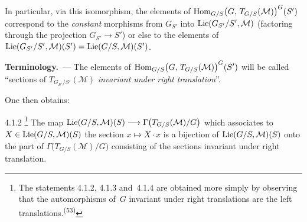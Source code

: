 In particular, via this isomorphism, the elements of
\(\operatorname{Hom}_{G/S}\bigl(G,\,T_{G/S}(\mathcal{M})\bigr)^{G}(S')\)
correspond to the \emph{constant} morphisms from \(G_{S'}\) into
\(\operatorname{Lie}(G_{S'}/S',\mathcal{M})\) (\ie factoring through the projection
\(G_{S'}\to S'\)) or else to the elements of
\(\operatorname{Lie}(G_{S'}/S',\mathcal{M})(S')=\operatorname{Lie}(G/S,\mathcal{M})(S')\).

\par{}
\noindent\textbf{Terminology.}\ ---
The elements of
\(\operatorname{Hom}_{G/S}\bigl(G,\,T_{G/S}(\mathcal{M})\bigr)^{G}(S')\)
will be called ``sections of \(T_{G_{S'}/S'}(\mathcal{M})\)
\emph{invariant under right translation}''.

One then obtains:

\begin{proposition}{4.1.2}\label{II.4.1.2}
{\renewcommand{\thefootnote}{*}\footnote{The statements 4.1.2, 4.1.3
and~4.1.4 are obtained more simply by observing that the automorphisms
of~\(G\) invariant under right translations are the left
translations.\textsuperscript{(53)}}}%
The map
\(\operatorname{Lie}(G/S,\mathcal{M})(S)\longrightarrow\Gamma\bigl(T_{G/S}(\mathcal{M})/G\bigr)\)
which associates to \(X\in\operatorname{Lie}(G/S,\mathcal{M})(S)\) the section
\(x\mapsto X\cdot x\) is a bijection of \(\operatorname{Lie}(G/S,\mathcal{M})(S)\) onto
the part of \(\Gamma\bigl(T_{G/S}(\mathcal{M})/G\bigr)\) consisting of the
sections invariant under right translation.
\end{proposition}
{\renewcommand{\thefootnote}{(53)}}
